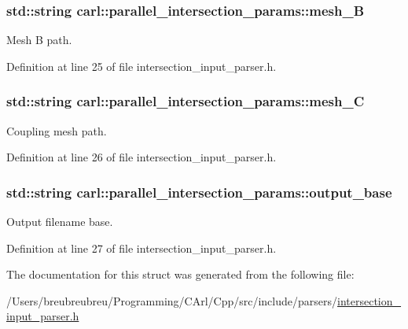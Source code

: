 \subsubsection[{mesh\+\_\+\+B}]{\setlength{\rightskip}{0pt plus 5cm}std\+::string carl\+::parallel\+\_\+intersection\+\_\+params\+::mesh\+\_\+\+B}\label{structcarl_1_1parallel__intersection__params_a77a1bbaf19e80f8dfd2612c2e86acb45}


Mesh B path. 



Definition at line 25 of file intersection\+\_\+input\+\_\+parser.\+h.

\hypertarget{structcarl_1_1parallel__intersection__params_ad1cf6ec92655114a12be003b05526697}{}
\subsubsection[{mesh\+\_\+\+C}]{\setlength{\rightskip}{0pt plus 5cm}std\+::string carl\+::parallel\+\_\+intersection\+\_\+params\+::mesh\+\_\+\+C}\label{structcarl_1_1parallel__intersection__params_ad1cf6ec92655114a12be003b05526697}


Coupling mesh path. 



Definition at line 26 of file intersection\+\_\+input\+\_\+parser.\+h.

\hypertarget{structcarl_1_1parallel__intersection__params_a74ba855a7e3dc3595531e6204eb57db2}{}
\subsubsection[{output\+\_\+base}]{\setlength{\rightskip}{0pt plus 5cm}std\+::string carl\+::parallel\+\_\+intersection\+\_\+params\+::output\+\_\+base}\label{structcarl_1_1parallel__intersection__params_a74ba855a7e3dc3595531e6204eb57db2}


Output filename base. 



Definition at line 27 of file intersection\+\_\+input\+\_\+parser.\+h.



The documentation for this struct was generated from the following file\+:\begin{DoxyCompactItemize}
\item 
/\+Users/breubreubreu/\+Programming/\+C\+Arl/\+Cpp/src/include/parsers/\hyperlink{intersection__input__parser_8h}{intersection\+\_\+input\+\_\+parser.\+h}\end{DoxyCompactItemize}
